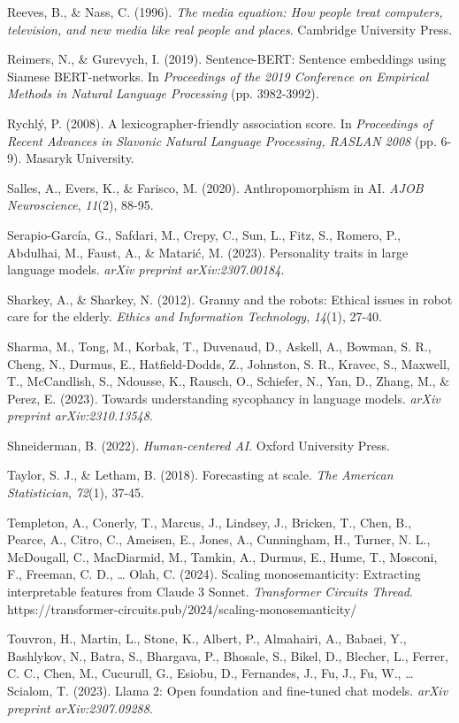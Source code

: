 \documentclass[11pt]{article}
\begin{document}
Reeves, B., \& Nass, C. (1996). \emph{The media equation: How people treat computers, television, and new media like real people and places}. Cambridge University Press.

Reimers, N., \& Gurevych, I. (2019). Sentence-BERT: Sentence embeddings using Siamese BERT-networks. In \emph{Proceedings of the 2019 Conference on Empirical Methods in Natural Language Processing} (pp. 3982-3992).

Rychlý, P. (2008). A lexicographer-friendly association score. In \emph{Proceedings of Recent Advances in Slavonic Natural Language Processing, RASLAN 2008} (pp. 6-9). Masaryk University.

Salles, A., Evers, K., \& Farisco, M. (2020). Anthropomorphism in AI. \emph{AJOB Neuroscience}, \emph{11}(2), 88-95.

Serapio-García, G., Safdari, M., Crepy, C., Sun, L., Fitz, S., Romero, P., Abdulhai, M., Faust, A., \& Matarić, M. (2023). Personality traits in large language models. \emph{arXiv preprint arXiv:2307.00184}.

Sharkey, A., \& Sharkey, N. (2012). Granny and the robots: Ethical issues in robot care for the elderly. \emph{Ethics and Information Technology}, \emph{14}(1), 27-40.

Sharma, M., Tong, M., Korbak, T., Duvenaud, D., Askell, A., Bowman, S. R., Cheng, N., Durmus, E., Hatfield-Dodds, Z., Johnston, S. R., Kravec, S., Maxwell, T., McCandlish, S., Ndousse, K., Rausch, O., Schiefer, N., Yan, D., Zhang, M., \& Perez, E. (2023). Towards understanding sycophancy in language models. \emph{arXiv preprint arXiv:2310.13548}.

Shneiderman, B. (2022). \emph{Human-centered AI}. Oxford University Press.

Taylor, S. J., \& Letham, B. (2018). Forecasting at scale. \emph{The American Statistician}, \emph{72}(1), 37-45.

Templeton, A., Conerly, T., Marcus, J., Lindsey, J., Bricken, T., Chen, B., Pearce, A., Citro, C., Ameisen, E., Jones, A., Cunningham, H., Turner, N. L., McDougall, C., MacDiarmid, M., Tamkin, A., Durmus, E., Hume, T., Mosconi, F., Freeman, C. D., \ldots{} Olah, C. (2024). Scaling monosemanticity: Extracting interpretable features from Claude 3 Sonnet. \emph{Transformer Circuits Thread}. https://transformer-circuits.pub/2024/scaling-monosemanticity/

Touvron, H., Martin, L., Stone, K., Albert, P., Almahairi, A., Babaei, Y., Bashlykov, N., Batra, S., Bhargava, P., Bhosale, S., Bikel, D., Blecher, L., Ferrer, C. C., Chen, M., Cucurull, G., Esiobu, D., Fernandes, J., Fu, J., Fu, W., \ldots{} Scialom, T. (2023). Llama 2: Open foundation and fine-tuned chat models. \emph{arXiv preprint arXiv:2307.09288}.
\end{document}
